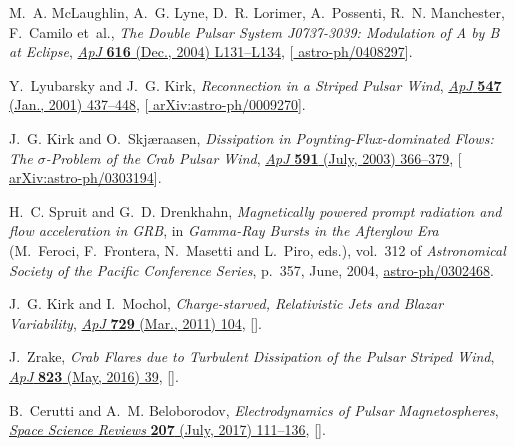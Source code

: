 \documentclass{PoS}
\newcommand{\ssr}{Space Science Reviews}
\newcommand{\apjl}{ApJ}
\newcommand{\apj}{ApJ}
\begin{document}
\begin{thebibliography}{10}
M.~A. {McLaughlin}, A.~G. {Lyne}, D.~R. {Lorimer}, A.~{Possenti}, R.~N.
  {Manchester}, F.~{Camilo} et~al., \emph{{The Double Pulsar System J0737-3039:
  Modulation of A by B at Eclipse}},
  \href{https://doi.org/10.1086/426813}{\emph{\apjl} {\bfseries 616} (Dec.,
  2004) L131--L134}, [\href{https://arxiv.org/abs/astro-ph/0408297}{{\ttfamily
  astro-ph/0408297}}].

Y.~{Lyubarsky} and J.~G. {Kirk}, \emph{{Reconnection in a Striped Pulsar
  Wind}}, \href{https://doi.org/10.1086/318354}{\emph{\apj} {\bfseries 547}
  (Jan., 2001) 437--448},
  [\href{https://arxiv.org/abs/arXiv:astro-ph/0009270}{{\ttfamily
  arXiv:astro-ph/0009270}}].

J.~G. {Kirk} and O.~{Skj{\ae}raasen}, \emph{{Dissipation in
  Poynting-Flux-dominated Flows: The {$\sigma$}-Problem of the Crab Pulsar
  Wind}}, \href{https://doi.org/10.1086/375215}{\emph{\apj} {\bfseries 591}
  (July, 2003) 366--379},
  [\href{https://arxiv.org/abs/arXiv:astro-ph/0303194}{{\ttfamily
  arXiv:astro-ph/0303194}}].

H.~C. {Spruit} and G.~D. {Drenkhahn}, \emph{{Magnetically powered prompt
  radiation and flow acceleration in GRB}},  in \emph{Gamma-Ray Bursts in the
  Afterglow Era} (M.~{Feroci}, F.~{Frontera}, N.~{Masetti} and L.~{Piro},
  eds.), vol.~312 of \emph{Astronomical Society of the Pacific Conference
  Series}, p.~357, June, 2004,
  \href{https://arxiv.org/abs/astro-ph/0302468}{{\ttfamily astro-ph/0302468}}.

J.~G. {Kirk} and I.~{Mochol}, \emph{{Charge-starved, Relativistic Jets and
  Blazar Variability}},
  \href{https://doi.org/10.1088/0004-637X/729/2/104}{\emph{\apj} {\bfseries
  729} (Mar., 2011) 104}, [\href{https://arxiv.org/abs/1012.0307}{{}}].

J.~{Zrake}, \emph{{Crab Flares due to Turbulent Dissipation of the Pulsar
  Striped Wind}}, \href{https://doi.org/10.3847/0004-637X/823/1/39}{\emph{\apj}
  {\bfseries 823} (May, 2016) 39},
  [\href{https://arxiv.org/abs/1512.05426}{{}}].

B.~{Cerutti} and A.~M. {Beloborodov}, \emph{{Electrodynamics of Pulsar
  Magnetospheres}},
  \href{https://doi.org/10.1007/s11214-016-0315-7}{\emph{\ssr} {\bfseries 207}
  (July, 2017) 111--136}, [\href{https://arxiv.org/abs/1611.04331}{{}}].


\end{thebibliography}
\end{document}
